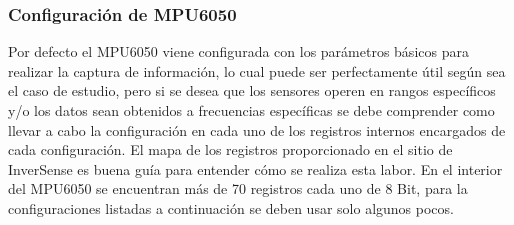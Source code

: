 \documentclass[12pt,a4paper]{article}
\begin{document}
\subsubsection{Configuración de MPU6050}
Por defecto el MPU6050 viene configurada con los parámetros básicos para realizar la captura de información, lo cual puede ser perfectamente útil según sea el caso de estudio, pero si se desea que los sensores operen en rangos específicos y/o los datos sean obtenidos a frecuencias específicas se debe comprender como llevar a cabo la configuración en cada uno de los registros internos encargados de cada configuración. El mapa de los registros \cite{MAPREGISTER} proporcionado  en el sitio de InverSense es buena guía para entender cómo se realiza esta labor.
\newline En el interior del MPU6050 se encuentran más de 70 registros cada uno de 8 Bit, para la configuraciones listadas a continuación se deben usar solo algunos pocos.
\end{document}
